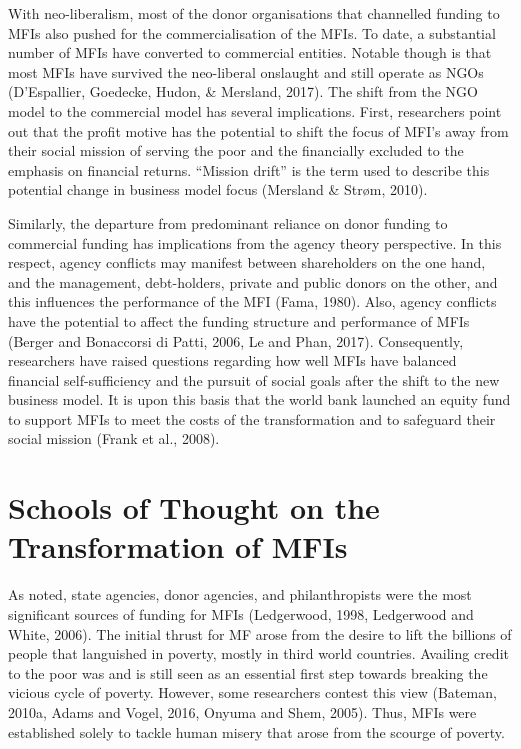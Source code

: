 \documentclass[a4paper, nobind]{templates/ociamthesis}
\begin{document}
With neo-liberalism, most of the donor organisations that channelled funding to MFIs also pushed for the commercialisation of the MFIs. To date, a substantial number of MFIs have converted to commercial entities. Notable though is that most MFIs have survived the neo-liberal onslaught and still operate as NGOs (D'Espallier, Goedecke, Hudon, \& Mersland, 2017). The shift from the NGO model to the commercial model has several implications. First, researchers point out that the profit motive has the potential to shift the focus of MFI's away from their social mission of serving the poor and the financially excluded to the emphasis on financial returns. ``Mission drift'' is the term used to describe this potential change in business model focus (Mersland \& Strøm, 2010).

Similarly, the departure from predominant reliance on donor funding to commercial funding has implications from the agency theory perspective. In this respect, agency conflicts may manifest between shareholders on the one hand, and the management, debt-holders, private and public donors on the other, and this influences the performance of the MFI (Fama, 1980). Also, agency conflicts have the potential to affect the funding structure and performance of MFIs (Berger and Bonaccorsi di Patti, 2006, Le and Phan, 2017). Consequently, researchers have raised questions regarding how well MFIs have balanced financial self-sufficiency and the pursuit of social goals after the shift to the new business model. It is upon this basis that the world bank launched an equity fund to support MFIs to meet the costs of the transformation and to safeguard their social mission (Frank et al., 2008).

\hypertarget{schools-of-thought-on-the-transformation-of-mfis}{%
\section{Schools of Thought on the Transformation of MFIs}\label{schools-of-thought-on-the-transformation-of-mfis}}

\noindent As noted, state agencies, donor agencies, and philanthropists were the most significant sources of funding for MFIs (Ledgerwood, 1998, Ledgerwood and White, 2006). The initial thrust for MF arose from the desire to lift the billions of people that languished in poverty, mostly in third world countries. Availing credit to the poor was and is still seen as an essential first step towards breaking the vicious cycle of poverty. However, some researchers contest this view (Bateman, 2010a, Adams and Vogel, 2016, Onyuma and Shem, 2005). Thus, MFIs were established solely to tackle human misery that arose from the scourge of poverty.
\end{document}
